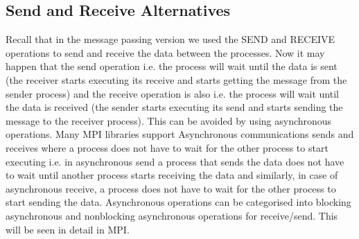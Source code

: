 \documentclass[12pt]{article}
\begin{document}
\subsection{Send and Receive Alternatives}
Recall that in the message passing version we used the SEND and RECEIVE operations to send and receive the data between the processes.
Now it may happen that the send operation i.e. the process will wait until the data is sent (the receiver starts executing its receive and starts getting the message from the sender process) 
and the receive operation is also i.e. the process will wait until the data is received (the sender starts executing its send and starts sending the message to the receiver process).
This can be avoided by using asynchronous operations. Many MPI libraries support Asynchronous communications sends and receives
where a process does not have to wait for the other process to start executing i.e. in asynchronous send a process that sends the data does not have to wait until another process starts receiving the data and similarly, in case of asynchronous receive,
a process does not have to wait for the other process to start sending the data. 
Asynchronous operations can be categorised into blocking asynchronous and nonblocking asynchronous operations for receive/send. This will be seen in detail in MPI.
\end{document}
